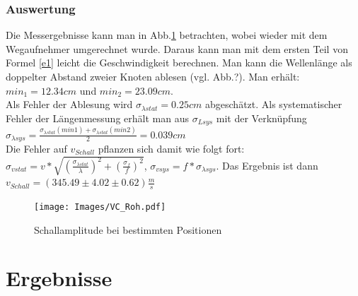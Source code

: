 \documentclass[]{article}
\begin{document}
	\subsubsection{Auswertung}
	
	Die Messergebnisse kann man in Abb.\ref{Vc_Roh} betrachten, wobei wieder mit dem Wegaufnehmer umgerechnet wurde. Daraus kann man mit dem ersten Teil von Formel \ref{e1} leicht die Geschwindigkeit berechnen. Man kann die Wellenlänge als doppelter Abstand zweier Knoten ablesen (vgl. Abb.?). Man erhält: $min_1=12.34cm$ und $min_2=23.09cm$.\\ 
	 Als Fehler der Ablesung wird $\sigma_{\lambda stat}=0.25cm$ abgeschätzt. Als systematischer Fehler der Längenmessung erhält man aus $\sigma_{Lsys}$ mit der Verknüpfung $\sigma_{\lambda sys} = \frac{\sigma_{\lambda stat}(min1)+\sigma_{\lambda stat}(min2)}{2}=0.039cm$\\
	 Die Fehler auf $v_{Schall}$ pflanzen sich damit wie folgt fort: $\sigma_{vstat}=v*\sqrt{(\frac{\sigma_{\lambda stat}}{\lambda})^2+(\frac{\sigma_f}{f})^2}$, 
	 $\sigma_{vsys}=f*\sigma_{\lambda sys}$.
	 Das Ergebnis ist dann $v_{Schall}=(345.49 \pm 4.02 \pm 0.62)\frac{m}{s}$

	\begin{figure}
	\begin{center}
		\texttt{[image: Images/VC\_Roh.pdf]}
		\caption{Schallamplitude bei bestimmten Positionen}
		\label{Vc_Roh}
	\end{center}
	\end{figure}
	

	\section{Ergebnisse}
\end{document}
